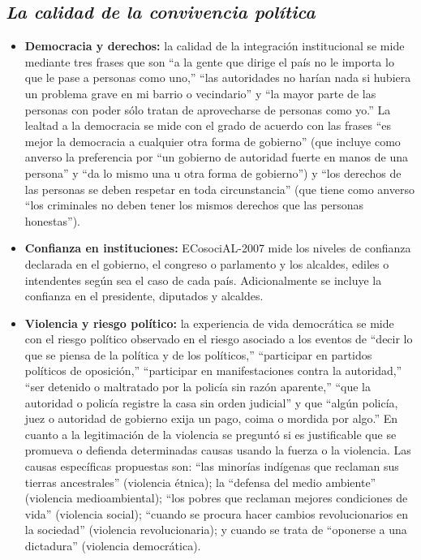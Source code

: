 \documentclass[
  12pt,
]{book}
\begin{document}
\hypertarget{la-calidad-de-la-convivencia-poluxedtica}{%
\subsection{\texorpdfstring{\emph{La calidad de la convivencia política}}{La calidad de la convivencia política}}\label{la-calidad-de-la-convivencia-poluxedtica}}

\begin{itemize}
\item
  \textbf{Democracia y derechos:} la calidad de la integración institucional se mide mediante tres frases que son ``a la gente que dirige el país no le importa lo que le pase a personas como uno,'' ``las autoridades no harían nada si hubiera un problema grave en mi barrio o vecindario'' y ``la mayor parte de las personas con poder sólo tratan de aprovecharse de personas como yo.'' La lealtad a la democracia se mide con el grado de acuerdo con las frases ``es mejor la democracia a cualquier otra forma de gobierno'' (que incluye como anverso la preferencia por ``un gobierno de autoridad fuerte en manos de una persona'' y ``da lo mismo una u otra forma de gobierno'') y ``los derechos de las personas se deben respetar en toda circunstancia'' (que tiene como anverso ``los criminales no deben tener los mismos derechos que las personas honestas'').
\item
  \textbf{Confianza en instituciones:} ECosociAL-2007 mide los niveles de confianza declarada en el gobierno, el congreso o parlamento y los alcaldes, ediles o intendentes según sea el caso de cada país. Adicionalmente se incluye la confianza en el presidente, diputados y alcaldes.
\item
  \textbf{Violencia y riesgo político:} la experiencia de vida democrática se mide con el riesgo político observado en el riesgo asociado a los eventos de ``decir lo que se piensa de la política y de los políticos,'' ``participar en partidos políticos de oposición,'' ``participar en manifestaciones contra la autoridad,'' ``ser detenido o maltratado por la policía sin razón aparente,'' ``que la autoridad o policía registre la casa sin orden judicial'' y que ``algún policía, juez o autoridad de gobierno exija un pago, coima o mordida por algo.'' En cuanto a la legitimación de la violencia se preguntó si es justificable que se promueva o defienda determinadas causas usando la fuerza o la violencia. Las causas específicas propuestas son: ``las minorías indígenas que reclaman sus tierras ancestrales'' (violencia étnica); la ``defensa del medio ambiente'' (violencia medioambiental); ``los pobres que reclaman mejores condiciones de vida'' (violencia social); ``cuando se procura hacer cambios revolucionarios en la sociedad'' (violencia revolucionaria); y cuando se trata de ``oponerse a una dictadura'' (violencia democrática).

\end{itemize}
\end{document}
